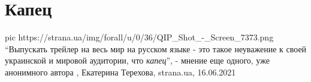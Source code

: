  
 
 
 
 
\chapter{Капец}

\ifcmt
  pic https://strana.ua/img/forall/u/0/36/QIP_Shot_-_Screen_7373.png
\fi
\enquote{Выпускать трейлер на весь мир на русском языке - это такое неуважение к своей
украинской и мировой аудитории, что \emph{капец}}, - мнение еще одного, уже анонимного
автора
, 
Екатерина Терехова, strana.ua, 16.06.2021
